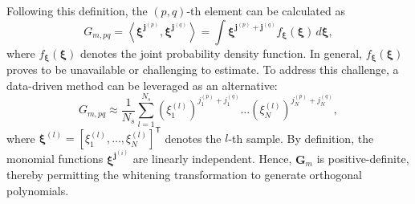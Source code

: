 \documentclass[journal]{IEEEtran}
\theoremstyle{definition}
\theoremstyle{remark}
\begin{document}
Following this definition, the $(p,q)$-th element can be calculated as
\begin{equation}
    G_{m,pq}=\left\langle \boldsymbol{\xi}^{\boldsymbol{j}^{(p)}}, \boldsymbol{\xi}^{\boldsymbol{j}^{(q)}} \right\rangle=\int \boldsymbol{\xi}^{\boldsymbol{j}^{(p)}+\boldsymbol{j}^{(q)}}f_{\boldsymbol{\xi}}(\boldsymbol{\xi}) \, d\boldsymbol{\xi},
\end{equation}
where $f_{\boldsymbol{\xi}}(\boldsymbol{\xi})$ denotes the joint probability density function.
In general, $f_{\boldsymbol{\xi}}(\boldsymbol{\xi})$ proves to be unavailable or challenging to estimate. To address this challenge, a data-driven method can be leveraged as an alternative:
\begin{equation}\label{eq:12}
    G_{m,pq}\approx\frac{1}{N_s}\sum\limits_{l=1}^{N_s}(\xi_1^{(l)})^{j_1^{(p)}+j_1^{(q)}}\dots(\xi_N^{(l)})^{j_N^{(p)}+j_N^{(q)}},
\end{equation}
where $\boldsymbol{\xi}^{(l)}=[\xi_1^{(l)},\dots,\xi_N^{(l)}]^{\mathsf{T}}$ denotes the $l$-th sample.
By definition, the monomial functions $\boldsymbol{\xi}^{\boldsymbol{j}^{(i)}}$ are linearly independent. Hence, $\boldsymbol{G}_m$ is positive-definite, thereby permitting the whitening transformation to generate orthogonal polynomials. 
\end{document}
